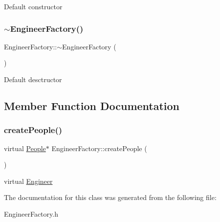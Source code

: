 Default constructor \mbox{\label{classEngineerFactory_af892e0d4b047414dbcefee0bbe943208}} 
\subsubsection{\texorpdfstring{$\sim$\+Engineer\+Factory()}{~EngineerFactory()}}
{\footnotesize\ttfamily Engineer\+Factory\+::$\sim$\+Engineer\+Factory (\begin{DoxyParamCaption}{ }\end{DoxyParamCaption})}

Default desctructor 

\subsection{Member Function Documentation}
\mbox{\label{classEngineerFactory_ad2ceb4fb6155ca3ad46934208195a8f3}} 
\subsubsection{\texorpdfstring{create\+People()}{createPeople()}}
{\footnotesize\ttfamily virtual \hyperlink{classPeople}{People}$\ast$ Engineer\+Factory\+::create\+People (\begin{DoxyParamCaption}{ }\end{DoxyParamCaption})\hspace{0.3cm}{\ttfamily [pure virtual]}}

virtual \hyperlink{classEngineer}{Engineer} 

The documentation for this class was generated from the following file\+:\begin{DoxyCompactItemize}
\item 
Engineer\+Factory.\+h\end{DoxyCompactItemize}
